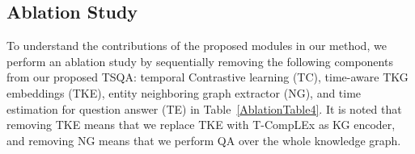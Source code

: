 \documentclass[11pt]{article}
\newcommand{\gt}[1]{{{\textcolor{cyan}{[gt: #1]}}}}
\begin{document}



\subsection{Ablation Study}
To understand the contributions of the proposed modules in our method, we perform an ablation study by sequentially removing the following components from our proposed TSQA: temporal Contrastive learning (TC), time-aware TKG embeddings (TKE), entity neighboring graph extractor (NG), and time estimation for question answer (TE) in Table~\ref{AblationTable4}. It is noted that removing TKE means that we replace TKE with T-CompLEx as KG encoder, and removing NG means that we perform QA over the whole knowledge graph.
\end{document}
